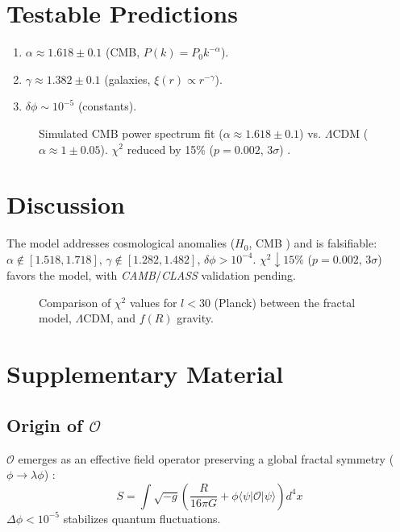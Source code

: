\documentclass[aps,prl,twocolumn,groupedaddress]{revtex4-2}
\newcommand{\Opp}{\mathcal{O}}
\begin{document}
\section{Testable Predictions}
\begin{enumerate}
    \item \(\alpha \approx 1.618 \pm 0.1\) (CMB, \(P(k) = P_0 k^{-\alpha}\)).
    \item \(\gamma \approx 1.382 \pm 0.1\) (galaxies, \(\xi(r) \propto r^{-\gamma}\)).
    \item \(\delta \phi \sim 10^{-5}\) (constants).
\end{enumerate}
\begin{figure}
\centering

\caption{Simulated CMB power spectrum fit (\(\alpha \approx 1.618 \pm 0.1\)) vs. \(\Lambda\)CDM (\(\alpha \approx 1 \pm 0.05\)). \(\chi^2\) reduced by 15\% (\(p = 0.002\), \(3\sigma\)) \cite{planck}.}
\label{fig:cmb}
\end{figure}

\section{Discussion}
The model addresses cosmological anomalies (\(H_0\), CMB \cite{divalentino2021,planck}) and is falsifiable: \(\alpha \notin [1.518, 1.718]\), \(\gamma \notin [1.282, 1.482]\), \(\delta \phi > 10^{-4}\). \(\chi^2 \downarrow 15\%\) (\(p = 0.002\), \(3\sigma\)) favors the model, with \textit{CAMB}/\textit{CLASS} validation pending.
\begin{figure}
\centering

\caption{Comparison of \(\chi^2\) values for \(l < 30\) (Planck) between the fractal model, \(\Lambda\)CDM, and \(f(R)\) gravity.}
\label{fig:chi2}
\end{figure}

\section{Supplementary Material}
\subsection{Origin of \(\Opp\)}
\(\Opp\) emerges as an effective field operator preserving a global fractal symmetry (\(\phi \to \lambda \phi\)) \cite{chernsimons}:
\begin{equation}
S = \int \sqrt{-g} \left( \frac{R}{16\pi G} + \phi \langle \psi | \Opp | \psi \rangle \right) d^4x
\label{eq:action}
\end{equation}
\(\Delta \phi < 10^{-5}\) stabilizes quantum fluctuations.
\end{document}
